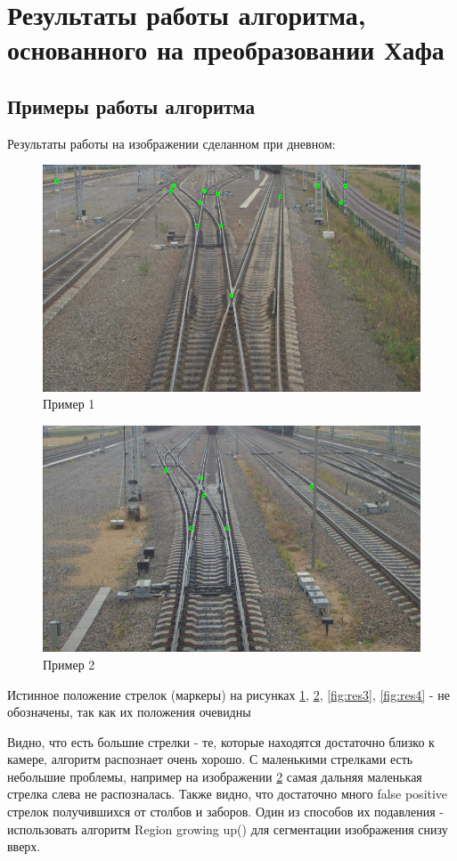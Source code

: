 \section{Результаты работы алгоритма, основанного на преобразовании Хафа}
\subsection{Примеры работы алгоритма}
Результаты работы на изображении сделанном при дневном:
\begin{figure}[!h]
	\centering
	\includegraphics[width=0.7\linewidth]{pictures/screenshot0015}
	\caption{Пример 1}
	\label{fig:res1}
\end{figure}
\begin{figure}[!h]
	\centering
	\includegraphics[width=0.7\linewidth]{pictures/screenshot0016}
	\caption{Пример 2}
	\label{fig:res2}
\end{figure}
\newpage

Истинное положение стрелок (маркеры) на рисунках \ref{fig:res1}, \ref{fig:res2}, \ref{fig:res3}, \ref{fig:res4} - не обозначены, так как их положения очевидны

Видно, что есть большие стрелки - те, которые находятся достаточно близко к камере, алгоритм распознает очень хорошо. С маленькими стрелками есть небольшие проблемы, например на изображении \ref{fig:res2} самая дальняя маленькая стрелка слева не распозналась.\newline
Также видно, что достаточно много false positive стрелок получившихся от столбов и заборов. Один из способов их подавления - использовать алгоритм Region growing up(\cite{b:growing_up}) для сегментации изображения снизу вверх.

